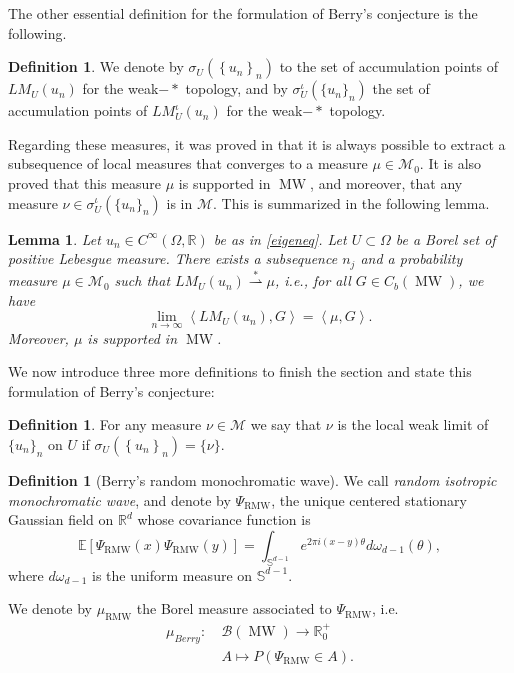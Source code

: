 \documentclass{amsart}
\newtheorem{lemma}[theorem]{Lemma}
\theoremstyle{definition}
\newtheorem{definition}[theorem]{Definition}
\theoremstyle{remark}
\numberwithin{equation}{section}
\theoremstyle{definition}
\theoremstyle{remark}
\DeclareMathOperator\MW{MW}
\newcommand\muRMW{\mu_{\mathrm{RMW}}}
\newcommand{\LM}{LM}
\newcommand\PsiR{\Psi_{\mathrm{RMW}}}
\begin{document}
The other essential definition for the formulation of Berry's conjecture is the following.
\begin{definition}
	We denote by $\sigma_{U}\left(\left\{u_n\right\}_n\right)$ to the set of accumulation points of $\LM_{U}(u_n)$ for the weak$-*$ topology, and by $\sigma_{U}^{\iota}\left(\{u_n\}_n\right)$ the set of accumulation points of $\LM_{U}^{\iota}\left(u_n\right)$ for the weak$-*$ topology.
\end{definition}
 Regarding these measures, it was proved in \cite[Corollary 1]{Ingremeau} that it is always possible to extract a subsequence of local measures that  converges to a measure $\mu\in\mathcal{M}_0$. It is also proved that this measure $\mu$ is supported in $\MW$, and moreover, that any measure $\nu\in \sigma_{U}^{\iota}\left(\{u_n\}_n\right)$ is in $\mathcal{M}$. This is summarized in the following lemma. 
\begin{lemma}
	Let  $u_n\in C^\infty(\Omega,\mathbb{R})$ be as in \eqref{eigeneq}. Let $U\subset\Omega$ be a Borel set of positive Lebesgue measure. There exists a subsequence $n_j$ and a probability measure $\mu\in\mathcal{M}_0$ such that $\LM_{U}(u_n)\stackrel{*}{\rightharpoonup} \mu$, i.e., for all $G\in C_b\left(\MW\right)$, we have \begin{equation}
		\lim_{n\to\infty}\left\langle\LM_{U}(u_n),G\right\rangle=\left\langle\mu,G\right\rangle.
	\end{equation}
	Moreover, $\mu$ is supported in $\MW$.
\end{lemma}
We now introduce three more definitions to finish the section and state this formulation of Berry's conjecture:
\begin{definition}
	For any measure $ \nu\in\mathcal{M}$ we say that $\nu$ is the local weak limit of $\{u_n\}_n$ on $U$ if $\sigma_U\left(\left\{u_n\right\}_n\right)=\{\nu\}$. 
\end{definition}
\begin{definition}[Berry's random monochromatic wave]
		
We call \emph{random isotropic monochromatic wave}, and denote by $\PsiR$, the unique centered stationary Gaussian field on $\mathbb{R}^d$ whose covariance function is\begin{equation}
	\mathbb{E}\left[\PsiR(x)\PsiR(y)\right]=\int_{\mathbb{S}^{d-1}}e^{2\pi i(x-y)\theta}d\omega_{d-1}(\theta),
\end{equation}where $d\omega_{d-1}$ is the uniform measure on $\mathbb{S}^{d-1}$.

We denote by  $\muRMW$ the Borel measure associated to $\PsiR$, i.e. \begin {equation}\begin{aligned}\mu_{Berry}:\ &\mathcal{B}(\MW)\rightarrow\mathbb{R}^+_0\\&A\mapsto P(\PsiR\in A).\end{aligned}\end{equation}
\end{definition}
\end{document}
